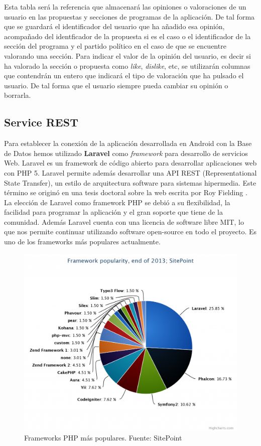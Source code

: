 Esta tabla será la referencia que almacenará las opiniones o valoraciones de un usuario en las propuestas y secciones de programas de la aplicación. De tal forma que se guardará el identificador del usuario que ha añadido esa opinión, acompañado del identficador de la propuesta si es el caso o el identificador de la sección del programa y el partido político en el caso de que se encuentre valorando una sección. Para indicar el valor de la opinión del usuario, es decir si ha valorado la sección o propuesta como \textit{like}, \textit{dislike}, etc, se utilizarán columnas que contendrán un entero que indicará el tipo de valoración que ha pulsado el usuario. De tal forma que el usuario siempre pueda cambiar su opinión o borrarla.

\subsection{Service REST} \label{ssec:seviceREST}

Para establecer la conexión de la aplicación desarrollada en Android con la Base de Datos hemos utilizado \textbf{Laravel} como \textit{framework} para desarrollo de servicios Web. Laravel \cite{ref:laravel} es un framework de código abierto para desarrollar aplicaciones web con PHP 5. Laravel permite además desarrollar una API REST (Representational State Transfer), un estilo de arquitectura software para sistemas hipermedia. Este término se originó en una tesis doctoral sobre la web escrita por Roy Fielding \cite{ref:RESTPhd}. La elección de Laravel como framework PHP se debió a su flexibilidad, la facilidad para programar la aplicación y el gran soporte que tiene de la comunidad. Además Laravel cuenta con una licencia de software libre MIT, lo que nos permite continuar utilizando software open-source en todo el proyecto. Es uno de los frameworks más populares actualmente.

\begin{figure}[H]
\centering
\includegraphics[keepaspectratio, scale=0.30]{Media/Captures/frameworkPopularity.png}
\caption{Frameworks PHP más populares. Fuente: SitePoint}
\label{fig:laravel5popularity}
\end{figure}


